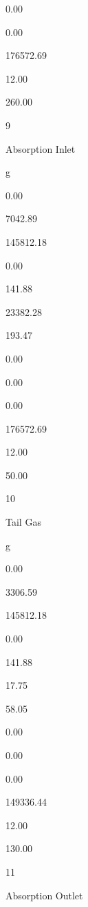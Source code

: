 \documentclass[a4paper,portrait,12pt]{article}
\begin{document}
0.00


0.00


176572.69


12.00


260.00





9


\begin{flushleft}
Absorption Inlet
\end{flushleft}


\begin{flushleft}
g
\end{flushleft}


0.00


7042.89


145812.18


0.00


141.88


23382.28


193.47


0.00


0.00


0.00


176572.69


12.00


50.00





10


\begin{flushleft}
Tail Gas
\end{flushleft}


\begin{flushleft}
g
\end{flushleft}


0.00


3306.59


145812.18


0.00


141.88


17.75


58.05


0.00


0.00


0.00


149336.44


12.00


130.00





11


\begin{flushleft}
Absorption Outlet
\end{flushleft}
\end{document}
